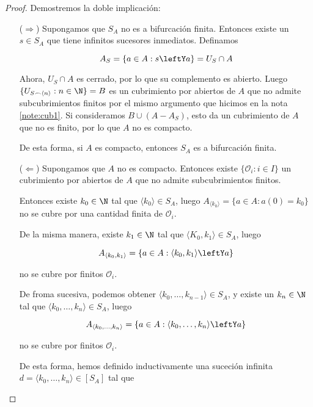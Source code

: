\begin{proof}
    Demostremos la doble implicación:
    
    \begin{itemize}
        \item[($\Rightarrow$)] Supongamos que $S_A$ no es a bifurcación finita. Entonces existe un $s \in S_A$ que tiene infinitos sucesores inmediatos. Definamos
        
        \[
        A_S = \{ a \in A : s \leftY a \} = U_S \cap A
        \]
        
        Ahora, $U_S \cap A$ es cerrado, por lo que su complemento es abierto. Luego $\{ U_{S \frown \langle n \rangle} : n \in \N \} = B$ es un cubrimiento por abiertos de $A$ que no admite subcubrimientos finitos por el mismo argumento que hicimos en la nota \ref{note:cub1}. Si consideramos $B \cup (A - A_S)$, esto da un cubrimiento de $A$ que no es finito, por lo que $A$ no es compacto.
        
        De esta forma, si $A$ es compacto, entonces $S_A$ es a bifurcación finita.
        
        \item[($\Leftarrow$)] Supongamos que $A$ no es compacto. Entonces existe $\{ \mathcal{O}_i : i \in I \}$ un cubrimiento por abiertos de $A$ que no admite subcubrimientos finitos.
        
        Entonces existe $k_0 \in \N$ tal que $\langle k_0 \rangle \in S_A$, luego $A_{\langle k_0 \rangle} = \{ a \in A: a(0) = k_0 \}$ no se cubre por una cantidad finita de $\mathcal{O}_i$.
        
        De la misma manera, existe $k_1 \in \N$ tal que $\langle K_0, k_1 \rangle \in S_A$, luego
        
        \[
        A_{\langle k_0, k_1 \rangle} = \{ a \in A : \langle k_0, k_1 \rangle \leftY a\}
        \]
        
        \noindent no se cubre por finitos $\mathcal{O}_i$.
        
        De froma sucesiva, podemos obtener $\langle k_0, \dots, k_{n-1} \rangle \in S_A$, y existe un $k_n \in \N$ tal que $\langle k_0, \dots, k_n \rangle \in S_A$, luego
        
        \[
        A_{\langle k_0, \dots, k_n \rangle} = \{ a \in A : \langle k_0, \dots, k_n \rangle \leftY a \}
        \]
        
        \noindent no se cubre por finitos $\mathcal{O}_i$.
        
        De esta forma, hemos definido inductivamente una suceción infinita $d = \langle k_0, \dots, k_n \rangle \in [S_A]$ tal que
        

\end{itemize}
\end{proof}
